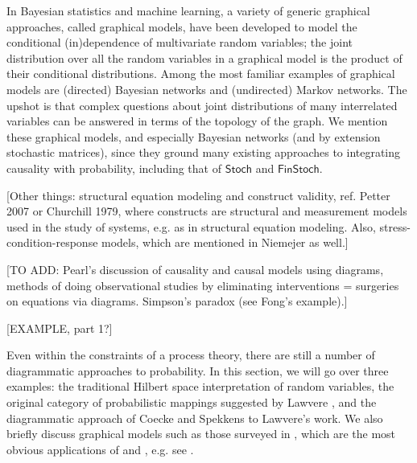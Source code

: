 \documentclass[sigconf]{acmart}
\newcommand{\redout}[1]{{\color{red}#1}}
\newcommand{\Cat}[1]{\mathsf{#1}}
\def\Stoch{\Cat{Stoch}}
\def\FinStoch{\Cat{FinStoch}}
\begin{document}
In Bayesian statistics and machine learning, a variety of generic graphical approaches, called graphical models, have been developed to model the conditional (in)dependence of multivariate random variables; the joint distribution over all the random variables in a graphical model is the product of their conditional distributions. Among the most familiar examples of graphical models are (directed) Bayesian networks and (undirected) Markov networks. The upshot is that complex questions about joint distributions of many interrelated variables can be answered in terms of the topology of the graph. We mention these graphical models, and especially Bayesian networks (and by extension stochastic matrices), since they ground many existing approaches to integrating causality with probability, including that of $\Stoch$ and $\FinStoch$. %

\redout{[Other things: structural equation modeling and construct validity, ref. Petter 2007 or Churchill 1979, where constructs are structural and measurement models used in the study of systems, e.g. as in structural equation modeling. Also, stress-condition-response models, which are mentioned in Niemejer as well.]}

\redout{[TO ADD: Pearl's discussion of causality and causal models using diagrams, methods of doing observational studies by eliminating interventions = surgeries on equations via diagrams. Simpson's paradox (see Fong's example).]}

\redout{[EXAMPLE, part 1?]}

Even within the constraints of a process theory, there are still a number of diagrammatic approaches to probability. In this section, we will go over three examples: the traditional Hilbert space interpretation of random variables, the original category of probabilistic mappings suggested by Lawvere \cite{lawvere62}, and the diagrammatic approach of Coecke and Spekkens \cite{coecke_spekkens} to Lawvere's work. We also briefly discuss graphical models such as those surveyed in \cite{lauritzen96}, which are the most obvious applications of \cite{lawvere62} and \cite{coecke_spekkens}, e.g. see \cite{fong13}.
\end{document}
